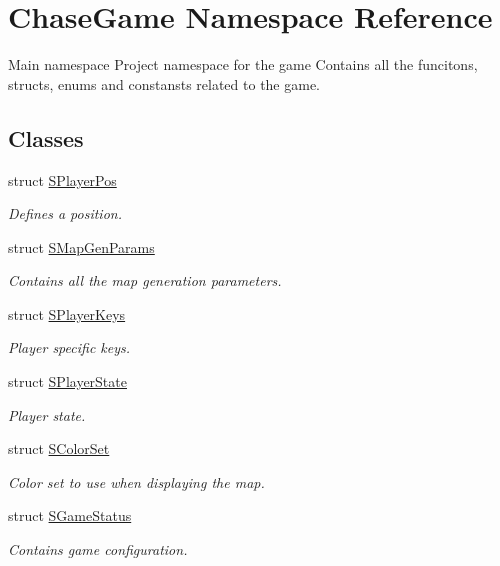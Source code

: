 \hypertarget{namespace_chase_game}{\section{Chase\-Game Namespace Reference}
\label{namespace_chase_game}
}


Main namespace Project namespace for the game Contains all the funcitons, structs, enums and constansts related to the game.  


\subsection*{Classes}
\begin{DoxyCompactItemize}
\item 
struct \hyperlink{struct_chase_game_1_1_s_player_pos}{S\-Player\-Pos}
\begin{DoxyCompactList}\small\item\em Defines a position. \end{DoxyCompactList}\item 
struct \hyperlink{struct_chase_game_1_1_s_map_gen_params}{S\-Map\-Gen\-Params}
\begin{DoxyCompactList}\small\item\em Contains all the map generation parameters. \end{DoxyCompactList}\item 
struct \hyperlink{struct_chase_game_1_1_s_player_keys}{S\-Player\-Keys}
\begin{DoxyCompactList}\small\item\em Player specific keys. \end{DoxyCompactList}\item 
struct \hyperlink{struct_chase_game_1_1_s_player_state}{S\-Player\-State}
\begin{DoxyCompactList}\small\item\em Player state. \end{DoxyCompactList}\item 
struct \hyperlink{struct_chase_game_1_1_s_color_set}{S\-Color\-Set}
\begin{DoxyCompactList}\small\item\em Color set to use when displaying the map. \end{DoxyCompactList}\item 
struct \hyperlink{struct_chase_game_1_1_s_game_status}{S\-Game\-Status}
\begin{DoxyCompactList}\small\item\em Contains game configuration. \end{DoxyCompactList}\end{DoxyCompactItemize}
